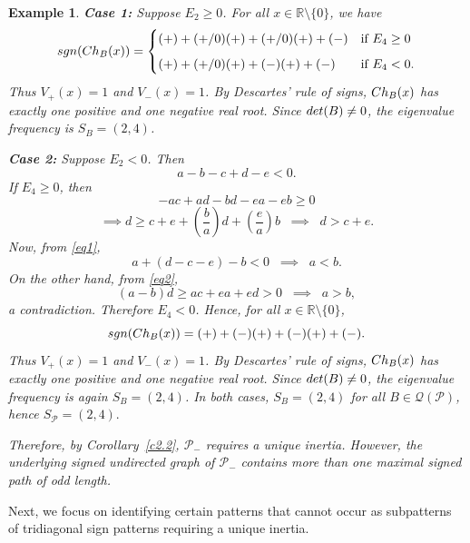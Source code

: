 \documentclass[10pt,a4paper]{amsart}
\newtheorem{eg}{Example}[section]
\numberwithin{equation}{section}
\def\det{{\rm det}}
\def\sgn{{\rm sgn}}
\def\Ch{{\rm Ch}}
\begin{document}
\begin{eg}
	\textbf{Case 1:} Suppose $E_2 \geq 0$.  
	For all $x \in \mathbb{R} \setminus \{0\}$, we have
	\[
	\sgn(\Ch_{B}(x)) = 
	\begin{cases} 
		(+)+(+/0)(+)+(+/0)(+)+(-) & \text{if } E_4 \geq 0 \\[6pt]
		(+)+(+/0)(+)+(-)(+)+(-) & \text{if } E_4 < 0.
	\end{cases}
	\]
	Thus $V_+(x) = 1$ and $V_-(x) = 1$. By Descartes' rule of signs, $\Ch_B(x)$ has exactly one positive and one negative real root. Since $\det(B) \neq 0$, the eigenvalue frequency is $S_B = (2,4)$.
	
	\medskip
	
	\textbf{Case 2:} Suppose $E_2 < 0$. Then
	\begin{equation} \label{eq1}
		a - b - c + d - e < 0.
	\end{equation}
	If $E_4 \geq 0$, then
	\begin{equation} \label{eq2}
		-ac + ad - bd - ea - eb \geq 0
	\end{equation}
	\[
	\implies d \geq c+e+\left(\frac{b}{a}\right)d+\left(\frac{e}{a}\right)b 
	\;\;\implies\;\; d > c+e.
	\]
	Now, from \eqref{eq1},
	\[
	a+(d-c-e)-b < 0 \;\;\implies\;\; a < b.
	\]
	On the other hand, from \eqref{eq2},
	\[
	(a-b)d \geq ac+ea+ed > 0 \;\;\implies\;\; a > b,
	\]
	a contradiction. Therefore $E_4 < 0$.
	Hence, for all $x \in \mathbb{R} \setminus \{0\}$,
	\[
	\sgn(\Ch_{B}(x)) = (+)+(-)(+)+(-)(+)+(-).
	\]
	Thus $V_+(x) = 1$ and $V_-(x) = 1$. By Descartes' rule of signs, $\Ch_B(x)$ has exactly one positive and one negative real root. Since $\det(B) \neq 0$, the eigenvalue frequency is again $S_B = (2,4)$.
	In both cases, $S_B = (2,4)$ for all $B \in \mathcal{Q}(\mathcal{P})$, hence
	$
	S_{\mathcal{P}} = (2,4).
	$
	
	Therefore, by Corollary~\ref{c2.2}, $\mathcal{P}_-$ requires a unique inertia. However, the underlying signed undirected graph of $\mathcal{P}_-$ contains more than one maximal signed path of odd length.
\end{eg}









Next, we focus on identifying certain patterns that cannot occur as subpatterns of tridiagonal sign patterns requiring a unique inertia.
\end{document}
